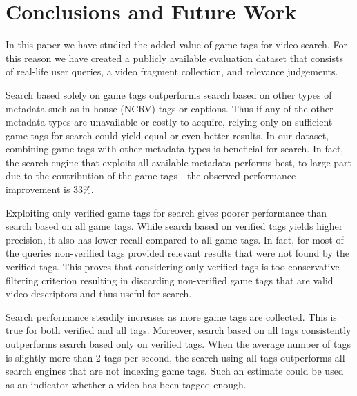 \section{Conclusions and Future Work}\label{sec:conclusions}
In this paper we have studied the added value of game tags for video search. For this reason we have created a publicly available evaluation dataset that consists of real-life user queries, a video fragment collection, and relevance judgements. 

Search based solely on game tags outperforms search based on other types of metadata such as in-house (NCRV) tags or captions. Thus if any of the other metadata types are unavailable or costly to acquire, relying only on sufficient game tags for search could yield equal or even better results. In our dataset, combining game tags with other metadata types is beneficial for search. In fact, the search engine that exploits all available metadata performs best, to large part due to the contribution of the game tags---the observed performance improvement is 33\%. 

Exploiting only verified game tags for search gives poorer performance than search based on all game tags. While search based on verified tags yields higher precision, it also has lower recall compared to all game tags. In fact, for most of the queries non-verified tags provided relevant results that were not found by the verified tags. This proves that considering only verified tags is too conservative filtering criterion resulting in discarding non-verified game tags that are valid video descriptors and thus useful for search. 

Search performance steadily increases as more game tags are collected. This is true for both verified and all tags. Moreover, search based on all tags consistently outperforms search based only on verified tags. When the average number of tags is slightly more than 2 tags per second, the search using all tags outperforms all search engines that are not indexing game tags. Such an estimate could be used as an indicator whether a video has been tagged enough.

